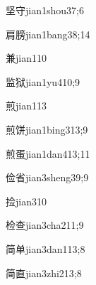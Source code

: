 \begin{verbete}{坚守}{jian1shou3}{7;6}
\end{verbete}

\begin{verbete}{肩膀}{jian1bang3}{8;14}
\end{verbete}

\begin{verbete}{兼}{jian1}{10}
\end{verbete}

\begin{verbete}{监狱}{jian1yu4}{10;9}
\end{verbete}

\begin{verbete}{煎}{jian1}{13}
\end{verbete}

\begin{verbete}{煎饼}{jian1bing3}{13;9}
\end{verbete}

\begin{verbete}{煎蛋}{jian1dan4}{13;11}
\end{verbete}

\begin{verbete}{俭省}{jian3sheng3}{9;9}
\end{verbete}

\begin{verbete}{捡}{jian3}{10}
\end{verbete}

\begin{verbete}{检查}{jian3cha2}{11;9}
\end{verbete}

\begin{verbete}{简单}{jian3dan1}{13;8}
\end{verbete}

\begin{verbete}{简直}{jian3zhi2}{13;8}
\end{verbete}

